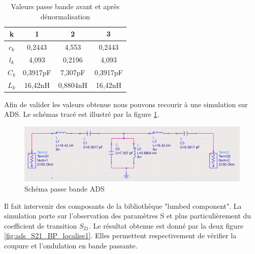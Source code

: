 \documentclass[french]{article}
\begin{document}
\begin{table}[H]
	\centering
	\begin{tabular}{|c|c|c|c|}
		\hline
		k & 1 & 2 & 3 \\
		\hline
		$c_k$ & 0,2443 & 4,553 & 0,2443 \\ \hline
		$l_k$ &	4,093	&	0,2196	&	4,093	\\ \hline
		$C_k$ &	0,3917pF&	7,307pF	&	0,3917pF\\ \hline
		$L_k$ &	16,42nH	&	0,8804nH& 16,42nH	\\ \hline
	\end{tabular}
	\caption{Valeurs passe bande avant et après dénormalisation}
	\label{tab:denorm_BP}
\end{table}
Afin de valider les valeurs obtenue nous pouvons recourir à une simulation sur ADS. Le schémas tracé est illustré par la figure \ref{fig:ads_sch_BP_localise}.
\begin{figure}[H]
	\centering
	\includegraphics[width=0.9\linewidth]{../4synthPBande/impedance/schema_passe_bande_localise}
	\caption{Schéma passe bande ADS}
	\label{fig:ads_sch_BP_localise}
\end{figure}
Il fait intervenir des composants de la bibliothèque "lumbed component". La simulation porte sur l'observation des paramètres S et plus particulièrement du coefficient de transition $S_{21}$. Le résultat obtenue est donné par la deux figure \ref{fig:ads_S21_BP_localise1}. Elles permettent respectivement de vérifier la coupure et l'ondulation en bande passante.
\end{document}
